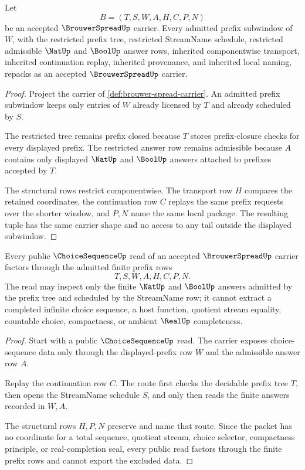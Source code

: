 \begin{theorem}
\label{thm:brouwer-spread-prefix-closure}
Let
$$
B=(T,S,W,A,H,C,P,N)
$$
be an accepted $\BrouwerSpreadUp$ carrier. Every admitted prefix subwindow of $W$, with the restricted prefix tree, restricted StreamName schedule, restricted admissible $\NatUp$ and $\BoolUp$ answer rows, inherited componentwise transport, inherited continuation replay, inherited provenance, and inherited local naming, repacks as an accepted $\BrouwerSpreadUp$ carrier.
\end{theorem}
\begin{proof}
Project the carrier of \autoref{def:brouwer-spread-carrier}. An admitted prefix subwindow keeps only entries of $W$ already licensed by $T$ and already scheduled by $S$.

The restricted tree remains prefix closed because $T$ stores prefix-closure checks for every displayed prefix. The restricted answer row remains admissible because $A$ contains only displayed $\NatUp$ and $\BoolUp$ answers attached to prefixes accepted by $T$.

The structural rows restrict componentwise. The transport row $H$ compares the retained coordinates, the continuation row $C$ replays the same prefix requests over the shorter window, and $P,N$ name the same local package. The resulting tuple has the same carrier shape and no access to any tail outside the displayed subwindow.
\end{proof}

\begin{theorem}
\label{thm:brouwer-spread-choice-sequence-factorization}
Every public $\ChoiceSequenceUp$ read of an accepted $\BrouwerSpreadUp$ carrier factors through the admitted finite prefix rows
$$
T,S,W,A,H,C,P,N.
$$
The read may inspect only the finite $\NatUp$ and $\BoolUp$ answers admitted by the prefix tree and scheduled by the StreamName row; it cannot extract a completed infinite choice sequence, a host function, quotient stream equality, countable choice, compactness, or ambient $\RealUp$ completeness.
\end{theorem}
\begin{proof}
Start with a public $\ChoiceSequenceUp$ read. The carrier exposes choice-sequence data only through the displayed-prefix row $W$ and the admissible answer row $A$.

Replay the continuation row $C$. The route first checks the decidable prefix tree $T$, then opens the StreamName schedule $S$, and only then reads the finite answers recorded in $W,A$.

The structural rows $H,P,N$ preserve and name that route. Since the packet has no coordinate for a total sequence, quotient stream, choice selector, compactness principle, or real-completion seal, every public read factors through the finite prefix rows and cannot export the excluded data.
\end{proof}

